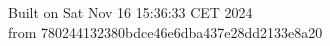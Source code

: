 {\noindent Built on Sat Nov 16 15:36:33 CET 2024} \\ 
 {\noindent from 780244132380bdce46e6dba437e28dd2133e8a20}

